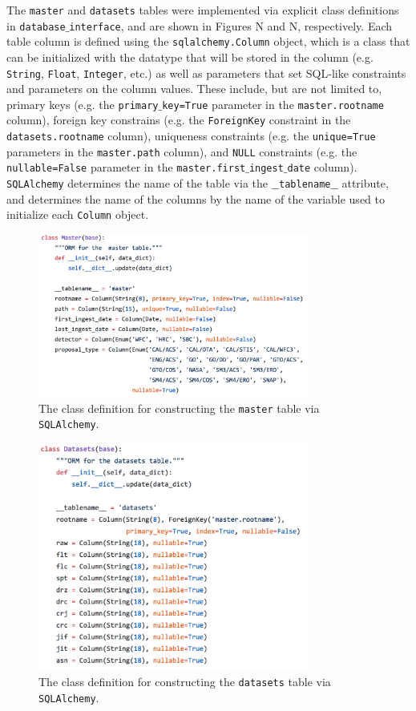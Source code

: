 \documentclass[10pt,journal,compsoc]{IEEEtran}
\begin{document}
The \texttt{master} and \texttt{datasets} tables were implemented via explicit class definitions in
\texttt{database$\_$interface}, and are shown in Figures N and N, respectively.  Each table column is
defined using the \texttt{sqlalchemy.Column} object, which is a class that can be initialized
with the datatype that will be stored in the column (e.g. \texttt{String}, \texttt{Float}, \texttt{Integer},
etc.) as well as parameters that set SQL-like constraints and parameters on the column values.  These
include, but are not limited to, primary keys (e.g. the \texttt{primary$\_$key=True} parameter in the
\texttt{master.rootname} column), foreign key constrains (e.g. the \texttt{ForeignKey} constraint in the
\texttt{datasets.rootname} column), uniqueness constraints (e.g. the \texttt{unique=True} parameters in
the \texttt{master.path} column), and \texttt{NULL} constraints (e.g. the \texttt{nullable=False} parameter
in the \texttt{master.first$\_$ingest$\_$date} column).  \texttt{SQLAlchemy} determines the name of the
table via the \texttt{$\_$$\_$tablename$\_$$\_$} attribute, and determines the name of the columns by
the name of the variable used to initialize each \texttt{Column} object.

\begin{figure}[!t]
\centering
\includegraphics[width=3.5in]{./figures/master_table.png}
\caption{The class definition for constructing the \texttt{master} table via \texttt{SQLAlchemy}.}
\label{fig1}
\end{figure}

\begin{figure}[!t]
\centering
\includegraphics[width=3.5in]{./figures/datasets_table.png}
\caption{The class definition for constructing the \texttt{datasets} table via \texttt{SQLAlchemy}.}
\label{fig1}
\end{figure}
\end{document}
